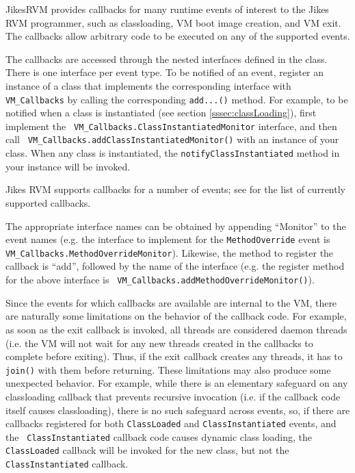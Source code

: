 

Jikes\trademark RVM provides callbacks for many runtime events of
interest to the Jikes RVM 
programmer, such as classloading, VM boot image creation, and VM exit.  The
callbacks allow arbitrary code to be executed on any of the supported events.

The callbacks are accessed through the nested interfaces defined in the 
class.  There is one interface per event type.  To be notified
of an event, register an instance of a class that implements the corresponding
interface with {\tt VM\_Callbacks} by calling the corresponding {\tt add...()}
method.  For example, to be notified when a class is instantiated (see section
\ref{sssec:classLoading}), first implement the {\tt
VM\_Callbacks.ClassInstantiatedMonitor} interface, and then call {\tt
VM\_Callbacks.addClassInstantiatedMonitor()} with an instance of your class.
When any class is instantiated, the {\tt notifyClassInstantiated} method in
your instance will be invoked.

Jikes RVM supports callbacks for a number of events; see 
 for the list of currently
supported callbacks.

The appropriate interface names can be obtained by appending ``Monitor'' to the
event names (e.g. the interface to implement for the {\tt MethodOverride} event
is {\tt VM\_Callbacks.MethodOverrideMonitor}).  Likewise, the method to
register the callback is ``add'', followed by the name of the interface (e.g.
the register method for the above interface is {\tt
VM\_Callbacks.addMethodOverrideMonitor()}).

Since the events for which callbacks are available are internal to the VM,
there are naturally some limitations on the behavior of the callback code.  For
example, as soon as the exit callback is invoked, all threads are considered
daemon threads (i.e. the VM will not wait for any new threads created in the
callbacks to complete before exiting).  Thus, if the exit callback creates any
threads, it has to {\tt join()} with them before returning.  These limitations
may also produce some unexpected behavior.  For example, while there is an
elementary safeguard on any classloading callback that prevents recursive
invocation (i.e. if the callback code itself causes classloading), there is no
such safeguard across events, so, if there are callbacks registered for both
{\tt ClassLoaded} and {\tt ClassInstantiated} events, and the {\tt
ClassInstantiated} callback code causes dynamic class loading, the {\tt
ClassLoaded} callback will be invoked for the new class, but not the {\tt
ClassInstantiated} callback.

